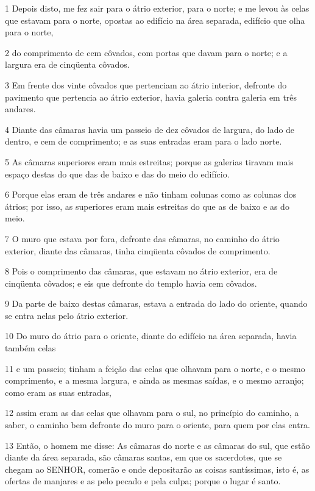 \par 1 Depois disto, me fez sair para o átrio exterior, para o norte; e me levou às celas que estavam para o norte, opostas ao edifício na área separada, edifício que olha para o norte,
\par 2 do comprimento de cem côvados, com portas que davam para o norte; e a largura era de cinqüenta côvados.
\par 3 Em frente dos vinte côvados que pertenciam ao átrio interior, defronte do pavimento que pertencia ao átrio exterior, havia galeria contra galeria em três andares.
\par 4 Diante das câmaras havia um passeio de dez côvados de largura, do lado de dentro, e cem de comprimento; e as suas entradas eram para o lado norte.
\par 5 As câmaras superiores eram mais estreitas; porque as galerias tiravam mais espaço destas do que das de baixo e das do meio do edifício.
\par 6 Porque elas eram de três andares e não tinham colunas como as colunas dos átrios; por isso, as superiores eram mais estreitas do que as de baixo e as do meio.
\par 7 O muro que estava por fora, defronte das câmaras, no caminho do átrio exterior, diante das câmaras, tinha cinqüenta côvados de comprimento.
\par 8 Pois o comprimento das câmaras, que estavam no átrio exterior, era de cinqüenta côvados; e eis que defronte do templo havia cem côvados.
\par 9 Da parte de baixo destas câmaras, estava a entrada do lado do oriente, quando se entra nelas pelo átrio exterior.
\par 10 Do muro do átrio para o oriente, diante do edifício na área separada, havia também celas
\par 11 e um passeio; tinham a feição das celas que olhavam para o norte, e o mesmo comprimento, e a mesma largura, e ainda as mesmas saídas, e o mesmo arranjo; como eram as suas entradas,
\par 12 assim eram as das celas que olhavam para o sul, no princípio do caminho, a saber, o caminho bem defronte do muro para o oriente, para quem por elas entra.
\par 13 Então, o homem me disse: As câmaras do norte e as câmaras do sul, que estão diante da área separada, são câmaras santas, em que os sacerdotes, que se chegam ao SENHOR, comerão e onde depositarão as coisas santíssimas, isto é, as ofertas de manjares e as pelo pecado e pela culpa; porque o lugar é santo.
